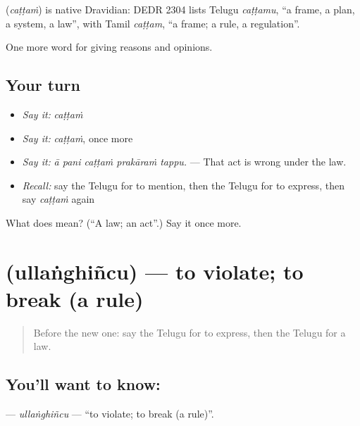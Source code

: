 \begin{cousinweb}
\textbf{} (\emph{caṭṭaṁ}) is native Dravidian: DEDR 2304 lists Telugu \emph{caṭṭamu}, \textquotedblleft{}a frame, a plan, a system, a law\textquotedblright{}, with Tamil \emph{caṭṭam}, \textquotedblleft{}a frame; a rule, a regulation\textquotedblright{}.
\end{cousinweb}

\begin{grammarlens}[title={What you've built}]
One more word for giving reasons and opinions.
\end{grammarlens}

\subsection*{Your turn}
\begin{itemize}
\raggedright
  \item \emph{Say it:} \emph{caṭṭaṁ}
  \item \emph{Say it:} \emph{caṭṭaṁ}, once more
  \item \emph{Say it:} \emph{ā pani caṭṭaṁ prakāraṁ tappu.} — That act is wrong under the law.
  \item \emph{Recall:} say the Telugu for to mention, then the Telugu for to express, then say \emph{caṭṭaṁ} again
\end{itemize}

\begin{tcolorbox}[breakable,colback=teal!4,colframe=teal!35!black,title={Before you move on}]
What does  mean? (\textquotedblleft{}A law; an act\textquotedblright{}.) Say it once more.
\end{tcolorbox}
\section[\texorpdfstring{\te{ఉల్లంఘించు} (ullaṅghiñcu)}{ఉల్లంఘించు (ullaṅghiñcu)}]{ (ullaṅghiñcu) — to violate; to break (a rule)}

\label{lesson:TE-C398-ullanghincu}



\begin{quote}
Before the new one: say the Telugu for to express, then the Telugu for a law.
\end{quote}

\subsection*{You'll want to know: }
\textbf{} — \emph{ullaṅghiñcu} — \textquotedblleft{}to violate; to break (a rule)\textquotedblright{}.

